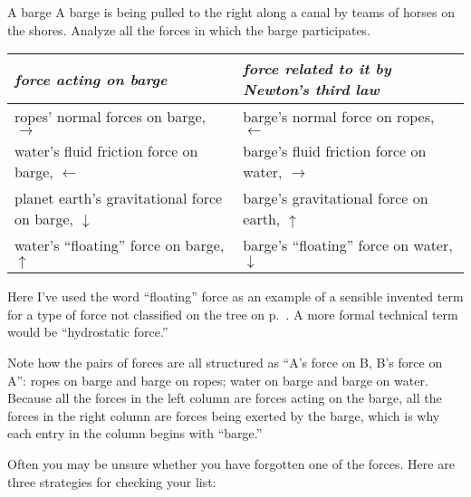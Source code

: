 \pagebreak

\begin{egwide}{A barge}
A barge is being pulled to the right along a canal by teams of horses on
the shores. Analyze all the forces in which the barge participates.

\begin{tabular}{|p{70mm}|p{70mm}|}
\hline
\emph{force acting on barge}  &   \emph{force related to it by Newton's third law} \\
\hline
ropes' normal forces on barge, $\rightarrow$  &  barge's normal force on ropes, $\leftarrow$\\
\hline
water's fluid friction force on barge, $\leftarrow$  &  barge's fluid friction force on water, $\rightarrow$\\
\hline
planet earth's gravitational force on barge, $\downarrow$  &  barge's gravitational force on earth, $\uparrow$\\
\hline
water's ``floating'' force on barge, $\uparrow$  &  barge's ``floating'' force on water, $\downarrow$\\
\hline
\end{tabular}

Here I've used the word ``floating'' force as an example of
a sensible invented term for a type of force not classified
on the tree on p.~\pageref{fig:force-tree}. A more formal technical
term would be ``hydrostatic force.''

Note how the pairs of forces are all structured as ``A's
force on B, B's force on A'': ropes on barge and barge on
ropes; water on barge and barge on water. Because all the
forces in the left column are forces acting on the barge,
all the forces in the right column are forces being exerted
by the barge, which is why each entry in the column
begins with ``barge.''
\end{egwide}

Often you may be unsure whether you have forgotten one of
the forces. Here are three strategies for checking your list:

